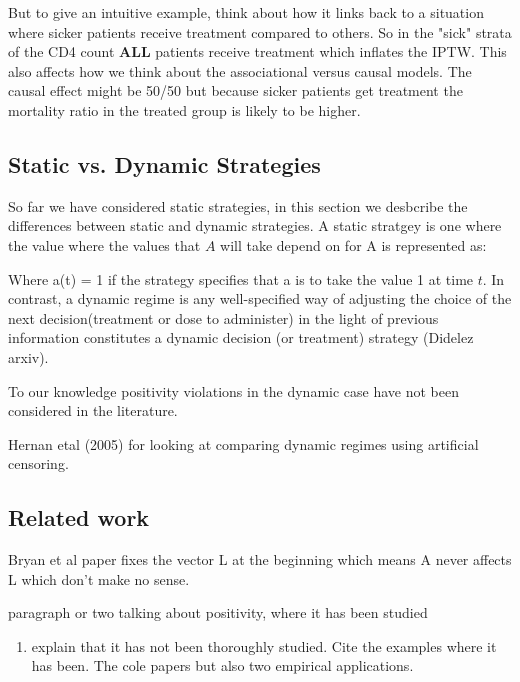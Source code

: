\documentclass[11pt]{article}
\providecommand{\tightlist}{%
      \setlength{\itemsep}{0pt}\setlength{\parskip}{0pt}}
\begin{document}
But to give an intuitive example, think about how it links back to a
situation where sicker patients receive treatment compared to others. So
in the "sick" strata of the CD4 count \textbf{ALL} patients receive
treatment which inflates the IPTW. This also affects how we think about
the associational versus causal models. The causal effect might be 50/50
but because sicker patients get treatment the mortality ratio in the
treated group is likely to be higher.

    \subsection{Static vs. Dynamic
Strategies}\label{static-vs.-dynamic-strategies}

So far we have considered static strategies, in this section we
desbcribe the differences between static and dynamic strategies. A
static stratgey is one where the value where the values that \(A\) will
take depend on for A is represented as:

Where a(t) = 1 if the strategy specifies that a is to take the value 1
at time \(t\). In contrast, a dynamic regime is any well-specified way
of adjusting the choice of the next decision(treatment or dose to
administer) in the light of previous information constitutes a dynamic
decision (or treatment) strategy (Didelez arxiv).

To our knowledge positivity violations in the dynamic case have not been
considered in the literature.

Hernan etal (2005) for looking at comparing dynamic regimes using
artificial censoring.

    \subsection{Related work}\label{related-work}

Bryan et al paper fixes the vector L at the beginning which means A
never affects L which don't make no sense.

paragraph or two talking about positivity, where it has been studied

\begin{enumerate}
\def\labelenumi{\arabic{enumi}.}
\setcounter{enumi}{2}
\tightlist
\item
  explain that it has not been thoroughly studied. Cite the examples
  where it has been. The cole papers but also two empirical
  applications.
\end{enumerate}
\end{document}

